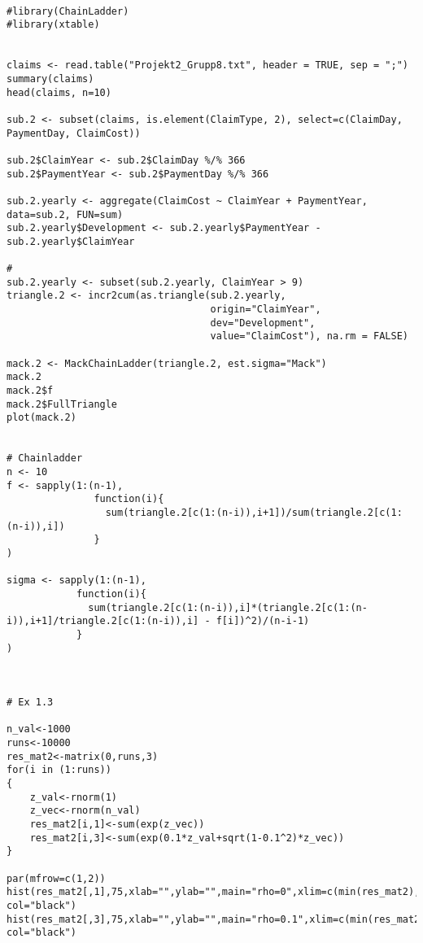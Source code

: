 \documentclass[11pt]{article}
\begin{document}
\begin{verbatim}

#library(ChainLadder)
#library(xtable)


claims <- read.table("Projekt2_Grupp8.txt", header = TRUE, sep = ";")
summary(claims)
head(claims, n=10)

sub.2 <- subset(claims, is.element(ClaimType, 2), select=c(ClaimDay, PaymentDay, ClaimCost))

sub.2$ClaimYear <- sub.2$ClaimDay %/% 366
sub.2$PaymentYear <- sub.2$PaymentDay %/% 366

sub.2.yearly <- aggregate(ClaimCost ~ ClaimYear + PaymentYear, data=sub.2, FUN=sum)
sub.2.yearly$Development <- sub.2.yearly$PaymentYear - sub.2.yearly$ClaimYear

#
sub.2.yearly <- subset(sub.2.yearly, ClaimYear > 9)
triangle.2 <- incr2cum(as.triangle(sub.2.yearly,
                                   origin="ClaimYear",
                                   dev="Development",
                                   value="ClaimCost"), na.rm = FALSE)

mack.2 <- MackChainLadder(triangle.2, est.sigma="Mack")
mack.2
mack.2$f
mack.2$FullTriangle
plot(mack.2)


# Chainladder
n <- 10
f <- sapply(1:(n-1),
               function(i){
                 sum(triangle.2[c(1:(n-i)),i+1])/sum(triangle.2[c(1:(n-i)),i])
               }
)

sigma <- sapply(1:(n-1),
            function(i){
              sum(triangle.2[c(1:(n-i)),i]*(triangle.2[c(1:(n-i)),i+1]/triangle.2[c(1:(n-i)),i] - f[i])^2)/(n-i-1)
            }
)



# Ex 1.3

n_val<-1000
runs<-10000
res_mat2<-matrix(0,runs,3)
for(i in (1:runs))
{
	z_val<-rnorm(1)
	z_vec<-rnorm(n_val)
	res_mat2[i,1]<-sum(exp(z_vec))
	res_mat2[i,3]<-sum(exp(0.1*z_val+sqrt(1-0.1^2)*z_vec))
}

par(mfrow=c(1,2))
hist(res_mat2[,1],75,xlab="",ylab="",main="rho=0",xlim=c(min(res_mat2),max(res_mat2)),
col="black")
hist(res_mat2[,3],75,xlab="",ylab="",main="rho=0.1",xlim=c(min(res_mat2),max(res_mat2)),
col="black")
\end{verbatim}
\end{document}

